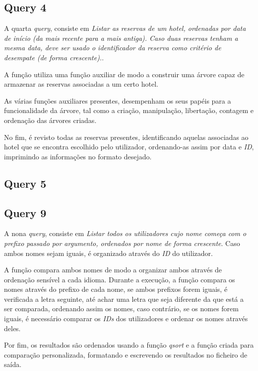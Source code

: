 \documentclass[a4paper,12pt]{scrreprt}
\begin{document}
\subsection{Query 4}

A quarta \textit{query}, consiste em \textit{Listar as reservas de um hotel, ordenadas por data de início (da mais recente para a mais antiga). Caso duas reservas tenham a mesma data, deve ser usado o identificador da reserva como critério de desempate (de forma crescente).}.

A função utiliza uma função auxiliar de modo a construir uma árvore capaz de armazenar as reservas associadas a um certo hotel. 

As várias funções auxiliares presentes, desempenham os seus papéis para a funcionalidade da árvore, tal como a criação, manipulação, libertação, contagem e ordenação das árvores criadas.

No fim, é revisto todas as reservas presentes, identificando aquelas associadas ao hotel que se encontra escolhido pelo utilizador, ordenando-as assim por data e \textit{ID}, imprimindo as informações no formato desejado.

\subsection{Query 5}

\subsection{Query 9}

A nona \textit{query}, consiste em \textit{Listar todos os utilizadores cujo nome começa com o prefixo passado por argumento, ordenados por nome de forma crescente}. Caso ambos nomes sejam iguais, é organizado através do \textit{ID} do utilizador.

A função compara ambos nomes de modo a organizar ambos através de ordenação sensível a cada idioma.
Durante a execução, a função compara os nomes através do prefixo de cada nome, se ambos prefixos forem iguais, é verificada a letra seguinte, até achar uma letra que seja diferente da que está a ser comparada, ordenando assim os nomes, caso contrário, se os nomes forem iguais, é necessário comparar os \textit{IDs} dos utilizadores e ordenar os nomes através deles.

Por fim, os resultados são ordenados usando a função \textit{qsort} e a função criada para comparação personalizada, formatando e escrevendo os resultados no ficheiro de saída.
\end{document}
